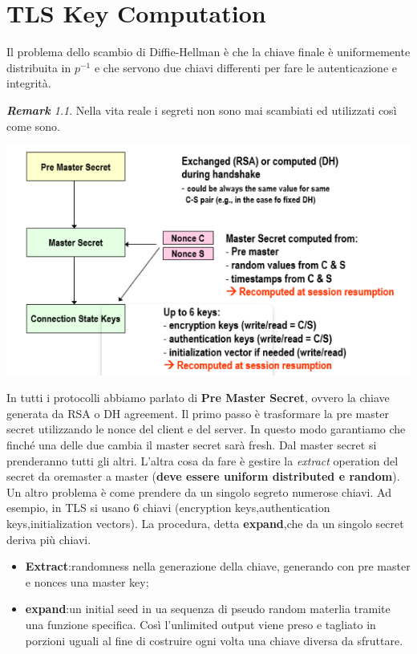 \documentclass{book}
\theoremstyle{remark}
\newtheorem*{remark}{\textbf{Remark}}
\begin{document}
\chapter{TLS Key Computation}
Il problema dello scambio di Diffie-Hellman è che la chiave finale è uniformemente distribuita in \(p^{-1}\) e che servono due chiavi differenti per fare le autenticazione e integrità\@.
\begin{remark}
	Nella vita reale i segreti non sono mai scambiati ed utilizzati così come sono\@.
\end{remark}
\begin{center}
	\includegraphics[scale=0.6]{2021-12-08-18-14-51.png}
\end{center}
In tutti i protocolli abbiamo parlato di \textbf{Pre Master Secret}, ovvero la chiave generata da RSA o DH agreement\@. Il primo passo è trasformare la pre master secret utilizzando le nonce del client e del server\@. In questo modo garantiamo che finché una delle due cambia il master secret sarà fresh\@. Dal master secret si prenderanno tutti gli altri\@. L'altra cosa da fare è gestire la \emph{extract} operation del secret da oremaster a master (\textbf{deve essere uniform distributed e random})\@.\newline
Un altro problema è come prendere da un singolo segreto numerose chiavi\@. Ad esempio, in TLS si usano 6 chiavi (encryption keys,authentication keys,initialization vectors)\@. La procedura, detta \textbf{expand},che da un singolo secret deriva più chiavi\@.
\begin{itemize}
	\item \textbf{Extract}:\@aggiunge randomness nella generazione della chiave, generando con pre master e nonces una master key;\@
	\item \textbf{expand}:\@espande un initial seed in ua sequenza di pseudo random materlia tramite una funzione specifica\@. Così l'unlimited output viene preso e tagliato in porzioni uguali al fine di costruire ogni volta una chiave diversa da sfruttare\@.
\end{itemize}
\end{document}
